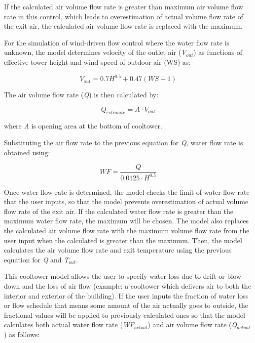 If the calculated air volume flow rate is greater than maximum air volume flow rate in this control, which leads to overestimation of actual volume flow rate of the exit air, the calculated air volume flow rate is replaced with the maximum.

For the simulation of wind-driven flow control where the water flow rate is unknown, the model determines velocity of the outlet air (\emph{V\(_{out}\)}) as functions of effective tower height and wind speed of outdoor air (WS) as:

\begin{equation}
{V_{out}} = 0.7{H^{0.5}} + 0.47(WS - 1)
\end{equation}

The air volume flow rate (\emph{Q}) is then calculated by:

\begin{equation}
{Q_{estimate}} = A \cdot {V_{out}}
\end{equation}

where \emph{A} is opening area at the bottom of cooltower.

Substituting the air flow rate to the previous equation for \emph{Q,} water flow rate is obtained using:

\begin{equation}
WF = \frac{Q}{{0.0125 \cdot {H^{0.5}}}}
\end{equation}

Once water flow rate is determined, the model checks the limit of water flow rate that the user inputs, so that the model prevents overestimation of actual volume flow rate of the exit air. If the calculated water flow rate is greater than the maximum water flow rate, the maximum will be chosen. The model also replaces the calculated air volume flow rate with the maximum volume flow rate from the user input when the calculated is greater than the maximum. Then, the model calculates the air volume flow rate and exit temperature using the previous equation for \emph{Q} and \emph{T\(_{out}\)}.

This cooltower model allows the user to specify water loss due to drift or blow down and the loss of air flow (example: a cooltower which delivers air to both the interior and exterior of the building). If the user inputs the fraction of water loss or flow schedule that means some amount of the air actually goes to outside, the fractional values will be applied to previously calculated ones so that the model calculates both actual water flow rate (\emph{WF\(_{actual}\)}) and air volume flow rate (\emph{Q\(_{actual}\)}) as follows:

